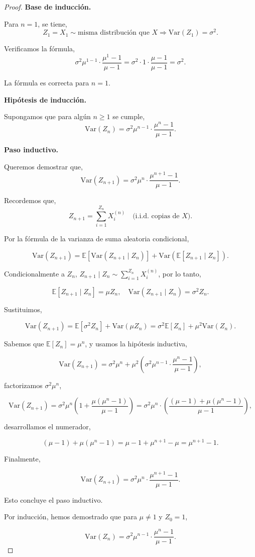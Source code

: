 \documentclass{article}
\begin{document}
\begin{proof}
\textbf{Base de inducción.}

Para \( n = 1 \), se tiene,
\[
Z_1 = X_1 \sim \text{misma distribución que } X
\Rightarrow \text{Var}(Z_1) = \sigma^2.
\]

Verificamos la fórmula,
\[
\sigma^2 \mu^{1 - 1} \cdot \frac{\mu^1 - 1}{\mu - 1}
= \sigma^2 \cdot 1 \cdot \frac{\mu - 1}{\mu - 1} = \sigma^2.
\]

La fórmula es correcta para \( n = 1 \).

\textbf{Hipótesis de inducción.}

Supongamos que para algún $n \geq 1$ se cumple,
\[
\text{Var}(Z_n) = \sigma^2 \mu^{n - 1} \cdot \frac{\mu^n - 1}{\mu - 1}.
\]

\textbf{Paso inductivo.}

Queremos demostrar que,
\[
\text{Var}(Z_{n+1}) = \sigma^2 \mu^n \cdot \frac{\mu^{n+1} - 1}{\mu - 1}.
\]

Recordemos que,
\[
Z_{n+1} = \sum_{i=1}^{Z_n} X_i^{(n)} \quad \text{(i.i.d. copias de } X\text{)}.
\]

Por la fórmula de la varianza de suma aleatoria condicional,

\[
\text{Var}(Z_{n+1}) = \mathbb{E}[\text{Var}(Z_{n+1} \mid Z_n)] + \text{Var}(\mathbb{E}[Z_{n+1} \mid Z_n]).
\]

Condicionalmente a $Z_n$, \( Z_{n+1} \mid Z_n \sim \sum_{i=1}^{Z_n} X_i^{(n)}\), por lo tanto,

\[
\mathbb{E}[Z_{n+1} \mid Z_n] = \mu Z_n, \quad \text{Var}(Z_{n+1} \mid Z_n) = \sigma^2 Z_n.
\]

Sustituimos,

\[
\text{Var}(Z_{n+1}) = \mathbb{E}[\sigma^2 Z_n] + \text{Var}(\mu Z_n)
= \sigma^2 \mathbb{E}[Z_n] + \mu^2 \text{Var}(Z_n).
\]

Sabemos que \( \mathbb{E}[Z_n] = \mu^n \), y usamos la hipótesis inductiva,

\[
\text{Var}(Z_{n+1}) = \sigma^2 \mu^n + \mu^2 \left( \sigma^2 \mu^{n-1} \cdot \frac{\mu^n - 1}{\mu - 1} \right),
\]

factorizamos \( \sigma^2 \mu^n \),

\[
\text{Var}(Z_{n+1}) = \sigma^2 \mu^n \left( 1 + \frac{\mu (\mu^n - 1)}{\mu - 1} \right)
= \sigma^2 \mu^n \cdot \left( \frac{(\mu - 1) + \mu(\mu^n - 1)}{\mu - 1} \right),
\]

desarrollamos el numerador,

\[
(\mu - 1) + \mu(\mu^n - 1) = \mu - 1 + \mu^{n+1} - \mu = \mu^{n+1} - 1.
\]

Finalmente,

\[
\text{Var}(Z_{n+1}) = \sigma^2 \mu^n \cdot \frac{\mu^{n+1} - 1}{\mu - 1}.
\]

Esto concluye el paso inductivo.

Por inducción, hemos demostrado que para $\mu \neq 1$ y $Z_0 = 1$,

\[
\text{Var}(Z_n) = \sigma^2 \mu^{n - 1} \cdot \frac{\mu^n - 1}{\mu - 1}.
\]
\end{proof}
\end{document}

